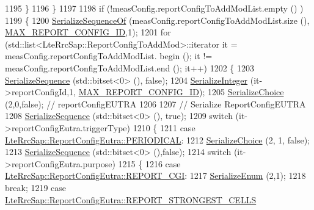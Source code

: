 \begin{DoxyCode}
1195         \}
1196     \}
1197 
1198   \textcolor{keywordflow}{if} (!measConfig.reportConfigToAddModList.empty () )
1199     \{
1200       \hyperlink{classns3_1_1Asn1Header_a066b6dd077bde6b0c243f3eda2621277}{SerializeSequenceOf} (measConfig.reportConfigToAddModList.size (),
      \hyperlink{lte-rrc-header_8cc_af8a3b931c04f0fa0e31e7c8480ba0bb6}{MAX\_REPORT\_CONFIG\_ID},1);
1201       \textcolor{keywordflow}{for} (std::list<LteRrcSap::ReportConfigToAddMod>::iterator it = measConfig.reportConfigToAddModList.
      begin (); it != measConfig.reportConfigToAddModList.end (); it++)
1202         \{
1203           \hyperlink{classns3_1_1Asn1Header_aa9744858380443ed95836fed08799aed}{SerializeSequence} (std::bitset<0> (), \textcolor{keyword}{false});
1204           \hyperlink{classns3_1_1Asn1Header_ab1c3bd37730affa7473bc759d625c29a}{SerializeInteger} (it->reportConfigId,1,
      \hyperlink{lte-rrc-header_8cc_af8a3b931c04f0fa0e31e7c8480ba0bb6}{MAX\_REPORT\_CONFIG\_ID});
1205           \hyperlink{classns3_1_1Asn1Header_a400ef4a710499da80fc55e23a973d4fa}{SerializeChoice} (2,0,\textcolor{keyword}{false}); \textcolor{comment}{// reportConfigEUTRA}
1206 
1207           \textcolor{comment}{// Serialize ReportConfigEUTRA}
1208           \hyperlink{classns3_1_1Asn1Header_aa9744858380443ed95836fed08799aed}{SerializeSequence} (std::bitset<0> (), \textcolor{keyword}{true});
1209           \textcolor{keywordflow}{switch} (it->reportConfigEutra.triggerType)
1210             \{
1211             \textcolor{keywordflow}{case} \hyperlink{structns3_1_1LteRrcSap_1_1ReportConfigEutra_a457763ab0765f15b66c62f8177fa412ea9b58d8f6c6d7ba8e59b08379fc3d92e7}{LteRrcSap::ReportConfigEutra::PERIODICAL}:
1212               \hyperlink{classns3_1_1Asn1Header_a400ef4a710499da80fc55e23a973d4fa}{SerializeChoice} (2, 1, \textcolor{keyword}{false}); 
1213               \hyperlink{classns3_1_1Asn1Header_aa9744858380443ed95836fed08799aed}{SerializeSequence} (std::bitset<0> (),\textcolor{keyword}{false});
1214               \textcolor{keywordflow}{switch} (it->reportConfigEutra.purpose)
1215                 \{
1216                 \textcolor{keywordflow}{case} \hyperlink{structns3_1_1LteRrcSap_1_1ReportConfigEutra_a2587c7b064e40788add4c94395026700a24c9629d34a67112c58eaf8949d06c65}{LteRrcSap::ReportConfigEutra::REPORT\_CGI}:
1217                   \hyperlink{classns3_1_1Asn1Header_ac8e56956823ab8e4470c09e162e7bf24}{SerializeEnum} (2,1);
1218                   \textcolor{keywordflow}{break};
1219                 \textcolor{keywordflow}{case} \hyperlink{structns3_1_1LteRrcSap_1_1ReportConfigEutra_a2587c7b064e40788add4c94395026700a448602bbc7d0d7ba4d5c27833c2ca041}{LteRrcSap::ReportConfigEutra::REPORT\_STRONGEST\_CELLS}

\end{DoxyCode}
